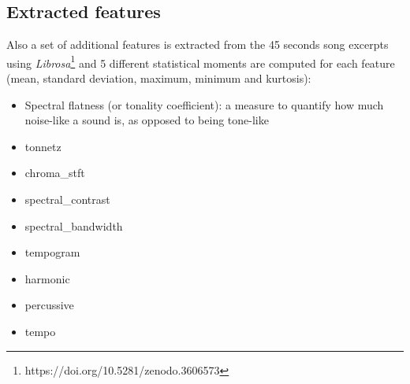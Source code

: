 \subsection{Extracted features}

Also a set of additional features is extracted  from the 45 seconds song excerpts using \emph{Librosa}\footnote{https://doi.org/10.5281/zenodo.3606573} and 5 different statistical moments are computed for each feature (mean, standard deviation, maximum, minimum and kurtosis):


\begin{itemize}
	\item Spectral flatness (or tonality coefficient): a measure to quantify how much noise-like a sound is, as opposed to being tone-like
	\item tonnetz
	\item chroma\_stft
	\item spectral\_contrast
	\item spectral\_bandwidth
	\item tempogram
	\item harmonic
	\item percussive
	\item tempo
\end{itemize}
